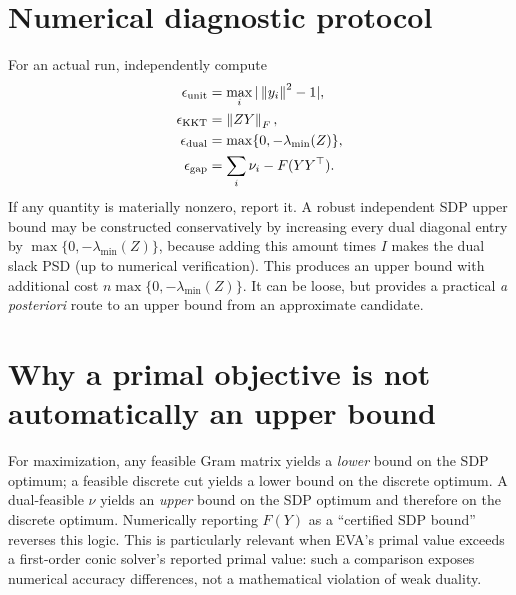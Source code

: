 \section{Numerical diagnostic protocol}
For an actual run, independently compute
\begin{align}
\epsilon_{\mathrm{unit}}&=\max_i|\left\lVert y_i\right\rVert^2-1|,\\
\epsilon_{\mathrm{KKT}}&=\left\lVert ZY\right\rVert_F,\\
\epsilon_{\mathrm{dual}}&=\max\{0,-\lambda_{\min}(Z)\},\\
\epsilon_{\mathrm{gap}}&=\sum_i\nu_i-F(YY^\top).
\end{align}
If any quantity is materially nonzero, report it. A robust independent SDP upper bound may be constructed conservatively by increasing every dual diagonal entry by $\max\{0,-\lambda_{\min}(Z)\}$, because adding this amount times $I$ makes the dual slack PSD (up to numerical verification). This produces an upper bound with additional cost $n\max\{0,-\lambda_{\min}(Z)\}$. It can be loose, but provides a practical \emph{a posteriori} route to an upper bound from an approximate candidate.

\section{Why a primal objective is not automatically an upper bound}
For maximization, any feasible Gram matrix yields a \emph{lower} bound on the SDP optimum; a feasible discrete cut yields a lower bound on the discrete optimum. A dual-feasible $\nu$ yields an \emph{upper} bound on the SDP optimum and therefore on the discrete optimum. Numerically reporting $F(Y)$ as a ``certified SDP bound'' reverses this logic. This is particularly relevant when EVA's primal value exceeds a first-order conic solver's reported primal value: such a comparison exposes numerical accuracy differences, not a mathematical violation of weak duality.
